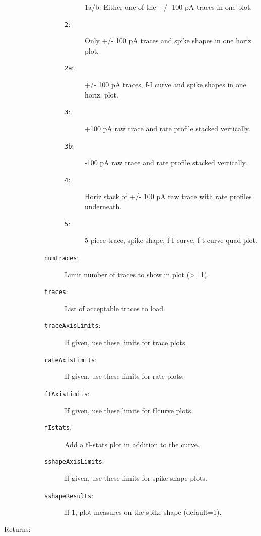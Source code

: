 \begin{description}
\begin{description}
\begin{description}
\begin{description}
1a/b: Either one of the +/- 100 pA traces in one plot.
\item[\texttt{2}:]
 Only +/- 100 pA traces and spike shapes in one horiz. plot.
\item[\texttt{2a}:]
 +/- 100 pA traces, f-I curve and spike shapes in one horiz. plot.
\item[\texttt{3}:]
 +100 pA raw trace and rate profile stacked vertically.
\item[\texttt{3b}:]
 -100 pA raw trace and rate profile stacked vertically.
\item[\texttt{4}:]
 Horiz stack of +/- 100 pA raw trace with rate profiles underneath.
\item[\texttt{5}:]
 5-piece trace, spike shape, f-I curve, f-t curve quad-plot.
\end{description}%
\item[\texttt{numTraces}:]
 Limit number of traces to show in plot (>=1).
\item[\texttt{traces}:]
 List of acceptable traces to load.
\item[\texttt{traceAxisLimits}:]
 If given, use these limits for trace plots.
\item[\texttt{rateAxisLimits}:]
 If given, use these limits for rate plots.
\item[\texttt{fIAxisLimits}:]
 If given, use these limits for fIcurve plots.
\item[\texttt{fIstats}:]
 Add a fI-stats plot in addition to the curve.
\item[\texttt{sshapeAxisLimits}:]
 If given, use these limits for spike shape plots.
\item[\texttt{sshapeResults}:]
 If 1, plot measures on the spike shape (default=1).
\end{description}%
\end{description}%
%
\item[Returns:
]~


\end{description}
